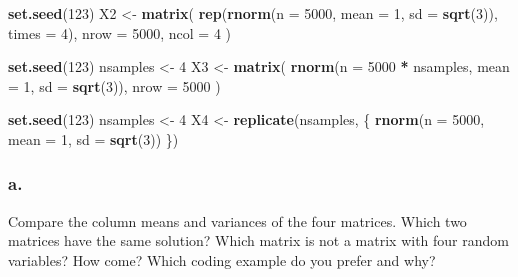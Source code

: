 \documentclass[]{article}
\newenvironment{Shaded}{\begin{snugshade}}{\end{snugshade}}
\newcommand{\DataTypeTok}[1]{\textcolor[rgb]{0.13,0.29,0.53}{#1}}
\newcommand{\DecValTok}[1]{\textcolor[rgb]{0.00,0.00,0.81}{#1}}
\newcommand{\KeywordTok}[1]{\textcolor[rgb]{0.13,0.29,0.53}{\textbf{#1}}}
\newcommand{\NormalTok}[1]{#1}
\newcommand{\OperatorTok}[1]{\textcolor[rgb]{0.81,0.36,0.00}{\textbf{#1}}}
\newcommand{\StringTok}[1]{\textcolor[rgb]{0.31,0.60,0.02}{#1}}
\begin{document}
\begin{Shaded}
\begin{Highlighting}[]
\KeywordTok{set.seed}\NormalTok{(}\DecValTok{123}\NormalTok{)}
\NormalTok{X2 <-}\StringTok{ }\KeywordTok{matrix}\NormalTok{(}
  \KeywordTok{rep}\NormalTok{(}\KeywordTok{rnorm}\NormalTok{(}\DataTypeTok{n =} \DecValTok{5000}\NormalTok{, }\DataTypeTok{mean =} \DecValTok{1}\NormalTok{, }\DataTypeTok{sd =} \KeywordTok{sqrt}\NormalTok{(}\DecValTok{3}\NormalTok{)), }\DataTypeTok{times =} \DecValTok{4}\NormalTok{),}
  \DataTypeTok{nrow =} \DecValTok{5000}\NormalTok{, }\DataTypeTok{ncol =} \DecValTok{4}
\NormalTok{)}
\end{Highlighting}
\end{Shaded}

\begin{Shaded}
\begin{Highlighting}[]
\KeywordTok{set.seed}\NormalTok{(}\DecValTok{123}\NormalTok{)}
\NormalTok{nsamples <-}\StringTok{ }\DecValTok{4}
\NormalTok{X3 <-}\StringTok{ }\KeywordTok{matrix}\NormalTok{(}
  \KeywordTok{rnorm}\NormalTok{(}\DataTypeTok{n =} \DecValTok{5000} \OperatorTok{*}\StringTok{ }\NormalTok{nsamples, }\DataTypeTok{mean =} \DecValTok{1}\NormalTok{, }\DataTypeTok{sd =} \KeywordTok{sqrt}\NormalTok{(}\DecValTok{3}\NormalTok{)), }
  \DataTypeTok{nrow =} \DecValTok{5000}
\NormalTok{)}
\end{Highlighting}
\end{Shaded}

\begin{Shaded}
\begin{Highlighting}[]
\KeywordTok{set.seed}\NormalTok{(}\DecValTok{123}\NormalTok{)}
\NormalTok{nsamples <-}\StringTok{ }\DecValTok{4}
\NormalTok{X4 <-}\StringTok{ }\KeywordTok{replicate}\NormalTok{(nsamples, \{}
  \KeywordTok{rnorm}\NormalTok{(}\DataTypeTok{n =} \DecValTok{5000}\NormalTok{, }\DataTypeTok{mean =} \DecValTok{1}\NormalTok{, }\DataTypeTok{sd =} \KeywordTok{sqrt}\NormalTok{(}\DecValTok{3}\NormalTok{))}
\NormalTok{\})}
\end{Highlighting}
\end{Shaded}

\hypertarget{a.-3}{%
\subsubsection{a.}\label{a.-3}}

Compare the column means and variances of the four matrices. Which two
matrices have the same solution? Which matrix is not a matrix with four
random variables? How come? Which coding example do you prefer and why?
\end{document}
